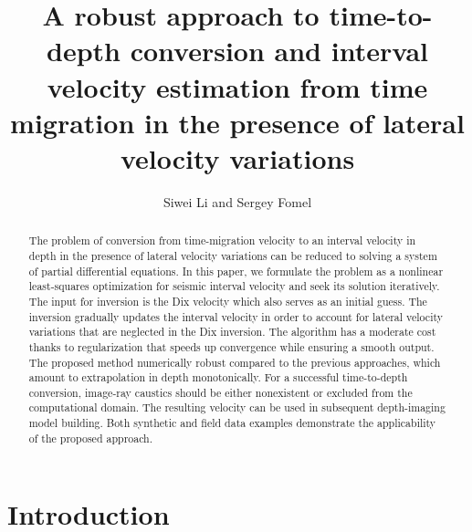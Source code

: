 \title{A robust approach to time-to-depth conversion and interval velocity 
estimation from time migration in the presence of lateral velocity variations}

\author{Siwei Li and Sergey Fomel}


\address{Bureau of Economic Geology \\
John A. and Katherine G. Jackson School of Geosciences \\
The University of Texas at Austin \\
University Station, Box X \\
Austin, TX 78713-8924}


\maketitle

\begin{abstract}

The problem of conversion from time-migration velocity to an interval velocity in depth in 
the presence of lateral velocity variations can be reduced to solving a system 
of partial differential equations. In this paper, we formulate the problem as a nonlinear 
least-squares optimization for seismic interval velocity and seek its solution 
iteratively. The input for inversion is the Dix velocity which also serves as an initial guess. The inversion 
gradually updates the interval velocity in order to account for lateral velocity 
variations that are neglected in the Dix inversion. The algorithm has a moderate cost thanks 
to regularization that speeds up convergence while ensuring a smooth output. The proposed method 
 numerically robust compared to the previous approaches, which amount to extrapolation 
in depth monotonically. For a successful time-to-depth conversion, image-ray caustics should be either 
nonexistent or excluded from the computational domain. The resulting velocity can be used in subsequent 
depth-imaging model building. Both synthetic and field data examples demonstrate the applicability 
of the proposed approach.

\end{abstract}

\section{Introduction}

